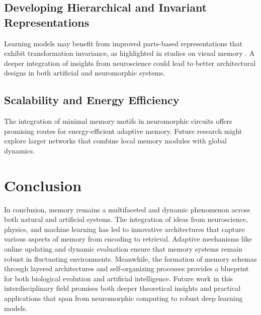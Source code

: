 \documentclass{article}
\begin{document}
\subsection{Developing Hierarchical and Invariant Representations}
Learning models may benefit from improved parts-based representations that exhibit transformation invariance, as highlighted in studies on visual memory \parencite{jitsev2010experiencedrivenformationpartsbasedrepresentations}. A deeper integration of insights from neuroscience could lead to better architectural designs in both artificial and neuromorphic systems.

\subsection{Scalability and Energy Efficiency}
The integration of minimal memory motifs in neuromorphic circuits \parencite{neves2023volatilememorymotifsminimal} offers promising routes for energy-efficient adaptive memory. Future research might explore larger networks that combine local memory modules with global dynamics.

\section{Conclusion}
\label{sec:conclusion}
In conclusion, memory remains a multifaceted and dynamic phenomenon across both natural and artificial systems. The integration of ideas from neuroscience, physics, and machine learning has led to innovative architectures that capture various aspects of memory from encoding to retrieval. Adaptive mechanisms like online updating and dynamic evaluation ensure that memory systems remain robust in fluctuating environments. Meanwhile, the formation of memory schemas through layered architectures and self-organizing processes provides a blueprint for both biological evolution and artificial intelligence. Future work in this interdisciplinary field promises both deeper theoretical insights and practical applications that span from neuromorphic computing to robust deep learning models.

\printbibliography
\end{document}
